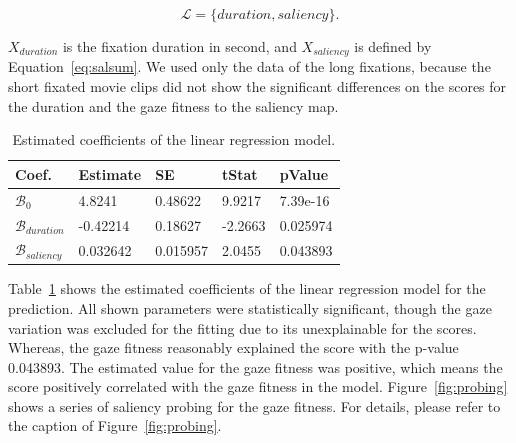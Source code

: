 \documentclass[10pt,letterpaper]{article}
\begin{document}
\begin{equation}\label{eq:l}
\mathcal{L} = \{duration, saliency\}.
\end{equation}

$X_{duration}$ is the fixation duration in second, and $X_{saliency}$ is defined by Equation~\ref{eq:salsum}. We used only the data of the long fixations, because the short fixated movie clips did not show the significant differences on the scores for the duration and the gaze fitness to the saliency map.

\begin{table}[ht]
\begin{center} 
\caption[Estimated coefficients of the linear regression model]{Estimated coefficients of the linear regression model.}
\vskip 0.12in
\label{tab:lr-coef} 
\begin{tabular}{lllll} 
\hline
Coef. & Estimate & SE & tStat & pValue \\ 
\hline
$\mathcal{B}_{0}$    &  4.8241   &  0.48622  &  9.9217 &  7.39e-16  \\
$\mathcal{B}_{duration}$ & -0.42214  &  0.18627  & -2.2663 &  0.025974    \\
$\mathcal{B}_{saliency}$ &  0.032642 &  0.015957 &  2.0455 &  0.043893    \\
\hline
\end{tabular} 
\end{center} 
\end{table}

Table~\ref{tab:lr-coef} shows the estimated coefficients of the linear regression model for the prediction. All shown parameters were statistically significant, though the gaze variation was excluded for the fitting due to its unexplainable for the scores. Whereas, the gaze fitness reasonably explained the score with the p-value 0.043893. The estimated value for the gaze fitness was positive, which means the score positively correlated with the gaze fitness in the model. Figure~\ref{fig:probing} shows a series of saliency probing for the gaze fitness. For details, please refer to the caption of Figure~\ref{fig:probing}.
\end{document}

